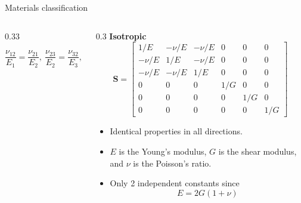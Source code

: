 \documentclass[aspectratio=169]{beamer}
\begin{document}
{\begin{frame}{Materials classification}
\begin{columns}[t]
\begin{column}{0.33\textwidth}
\begin{itemize}
              $$\frac{\nu_{12}}{E_1} = \frac{\nu_{21}}{E_2}, \
                \frac{\nu_{23}}{E_2} = \frac{\nu_{32}}{E_3}, \
                \frac{\nu_{31}}{E_3} = \frac{\nu_{13}}{E_1} $$
      \end{itemize}
    \end{column}
    \begin{column}{0.3\textwidth}
      \textbf{Isotropic}
      \tiny $$\mathbf S=\begin{bmatrix} 1/E & -\nu/E & -\nu/E & 0 & 0 & 0 \\  -\nu/E & 1/E  & -\nu/E  & 0 & 0 & 0 \\ -\nu/E & -\nu/E & 1/E & 0 & 0 & 0 \\ 0 & 0 & 0 & 1/G & 0 & 0 \\ 0 & 0 & 0 & 0 & 1/G & 0 \\ 0 & 0 & 0 & 0 & 0 & 1/G \end{bmatrix}$$
      \begin{itemize}
        \item Identical properties in all directions.
        \item $E$ is the Young's modulus, $G$ is the shear modulus, and $\nu$ is the Poisson's ratio.
        \item Only 2 independent constants since
              $$E=2G(1+\nu)$$
      \end{itemize}
    \end{column}
  \end{columns}
\end{frame}

}
\end{document}
